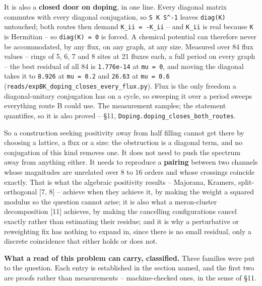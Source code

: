 \documentclass[10pt,letterpaper,twocolumn]{article}
\begin{document}
It is also a \textbf{closed door on doping}, in one line. Every diagonal matrix commutes with every
diagonal conjugation, so \texttt{S\ K\ S\^{}-{}\allowbreak{}1} leaves \texttt{diag(\allowbreak{}K)\allowbreak{}} untouched; both routes then demand
\texttt{K\_\allowbreak{}ii\ =\allowbreak{}\ -{}\allowbreak{}K\_\allowbreak{}ii} -- and \texttt{K\_\allowbreak{}ii} is real because \texttt{K} is Hermitian -- so \texttt{diag(\allowbreak{}K)\allowbreak{}\ =\allowbreak{}\ 0} is forced. A
chemical potential can therefore never be accommodated, by any flux, on any graph, at any size.
Measured over 84 flux values -- rings of 5, 6, 7 and 8 sites at 21 fluxes each, a full period
on every graph -- the best residual of all 84 is \texttt{1.\allowbreak{}776e-{}\allowbreak{}14} at \texttt{mu\ =\allowbreak{}\ 0}, and moving the diagonal
takes it to \texttt{8.\allowbreak{}926} at \texttt{mu\ =\allowbreak{}\ 0.\allowbreak{}2} and \texttt{26.\allowbreak{}63} at \texttt{mu\ =\allowbreak{}\ 0.\allowbreak{}6}
(\texttt{reads/\allowbreak{}expBK\_\allowbreak{}doping\_\allowbreak{}closes\_\allowbreak{}every\_\allowbreak{}flux.\allowbreak{}py}). Flux is the only freedom a diagonal-unitary
conjugation has on a cycle, so sweeping it over a period sweeps everything route B could use. The
measurement samples; the statement quantifies, so it is also proved -- §11,
\texttt{Doping.\allowbreak{}doping\_\allowbreak{}closes\_\allowbreak{}both\_\allowbreak{}routes}.

So a construction seeking positivity away from half filling cannot get there by choosing a lattice,
a flux or a size: the obstruction is a diagonal term, and no conjugation of this kind removes one.
It does not need to push the spectrum away from anything either. It needs to reproduce a \textbf{pairing}
between two channels whose magnitudes are unrelated over 8 to 16 orders and whose crossings coincide
exactly. That is what the algebraic
positivity results -- Majorana, Kramers, split-orthogonal {[}7, 8{]} -- achieve when they achieve it,
by making the weight a squared modulus so the question cannot arise; it is also what a
meron-cluster decomposition {[}11{]} achieves, by making the cancelling configurations cancel exactly
rather than estimating their residue; and it is why a perturbative or
reweighting fix has nothing to expand in, since there is no small residual, only a discrete
coincidence that either holds or does not.

\textbf{What a read of this problem can carry, classified.} Three families were put to the question.
Each entry is established in the section named, and the first two are proofs rather than
measurements -- machine-checked ones, in the sense of §11.
\end{document}
